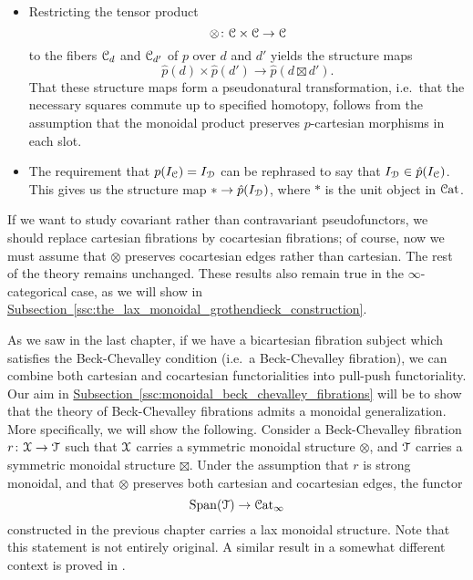 \documentclass[main.tex]{subfiles}
\begin{document}
\begin{itemize}
  \item Restricting the tensor product
    \begin{equation*}
      \otimes\colon \mathcal{C} \times \mathcal{C} \to \mathcal{C}
    \end{equation*}
    to the fibers $\mathcal{C}_{d}$ and $\mathcal{C}_{d'}$ of $p$ over $d$ and $d'$ yields the structure maps
    \begin{equation*}
      \hat{p}(d) \times \hat{p}(d') \to \hat{p}(d \boxtimes d').
    \end{equation*}
    That these structure maps form a pseudonatural transformation, i.e.\ that the necessary squares commute up to specified homotopy, follows from the assumption that the monoidal product preserves $p$-cartesian morphisms in each slot.

  \item The requirement that $p(I_{\mathcal{C}}) = I_{\mathcal{D}}$ can be rephrased to say that $I_{\mathcal{D}} \in \hat{p}(I_{\mathcal{C}})$. This gives us the structure map $\ast \to \hat{p}(I_{\mathcal{D}})$, where $\ast$ is the unit object in $\mathcal{C}\mathrm{at}$.
\end{itemize}

If we want to study covariant rather than contravariant pseudofunctors, we should replace cartesian fibrations by cocartesian fibrations; of course, now we must assume that $\otimes$ preserves cocartesian edges rather than cartesian. The rest of the theory remains unchanged. These results also remain true in the $\infty$-categorical case, as we will show in \hyperref[ssc:the_lax_monoidal_grothendieck_construction]{Subsection~\ref*{ssc:the_lax_monoidal_grothendieck_construction}}.

As we saw in the last chapter, if we have a bicartesian fibration subject which satisfies the Beck-Chevalley condition (i.e.\ a Beck-Chevalley fibration), we can combine both cartesian and cocartesian functorialities into pull-push functoriality. Our aim in \hyperref[ssc:monoidal_beck_chevalley_fibrations]{Subsection~\ref*{ssc:monoidal_beck_chevalley_fibrations}} will be to show that the theory of Beck-Chevalley fibrations admits a monoidal generalization. More specifically, we will show the following. Consider a Beck-Chevalley fibration $r\colon \mathcal{X} \to \mathcal{T}$ such that $\mathcal{X}$ carries a symmetric monoidal structure $\otimes$, and $\mathcal{T}$ carries a symmetric monoidal structure $\boxtimes$. Under the assumption that $r$ is strong monoidal, and that $\otimes$ preserves both cartesian and cocartesian edges, the functor
\begin{equation*}
  \mathrm{Span}(\mathcal{T}) \to \mathcal{C}\mathrm{at}_{\infty}
\end{equation*}
constructed in the previous chapter carries a lax monoidal structure. Note that this statement is not entirely original. A similar result in a somewhat different context is proved in \cite{spectralmackeyfunctors2}.
\end{document}
